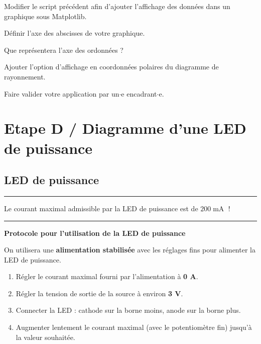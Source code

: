 \documentclass[a4paper,11pt,titlepage]{article} %
\begin{document}
\Manip Modifier le script précédent afin d'ajouter l'affichage des données dans un graphique sous Matplotlib. 

\Manip Définir l'axe des abscisses de votre graphique.

\Quest Que représentera l'axe des ordonnées ?


\medskip

\Manip Ajouter l'option d'affichage en coordonnées polaires du diagramme de rayonnement.

\bigskip

\begin{mdframed}[style=sidebar,frametitle={}]
\large
Faire valider votre application par un$\cdot$e encadrant$\cdot$e.
\end{mdframed}


\newpage
\section{Etape D / Diagramme d'une LED de puissance}


\subsection{LED de puissance}


\noindent \rule{\linewidth}{1pt}

{\Large Le courant maximal admissible par la LED de puissance est de \textbf{$200\operatorname{mA}$} !}

\noindent \rule{\linewidth}{1pt}

\medskip

\textbf{\LARGE Protocole pour l'utilisation de la LED de puissance}

\medskip

On utilisera une \textbf{alimentation stabilisée} avec les réglages fins pour alimenter la LED de puissance.

\bigskip

\begin{Large}

\begin{enumerate}
	\item Régler le courant maximal fourni par l'alimentation à \textbf{0 A}.
	\item Régler la tension de sortie de la source à environ \textbf{3 V}.
	\item Connecter la LED : cathode sur la borne moins, anode sur la borne plus.
	\item Augmenter lentement le courant maximal (avec le potentiomètre fin) jusqu'à la valeur souhaitée.
\end{enumerate}

\end{Large}
\end{document}
